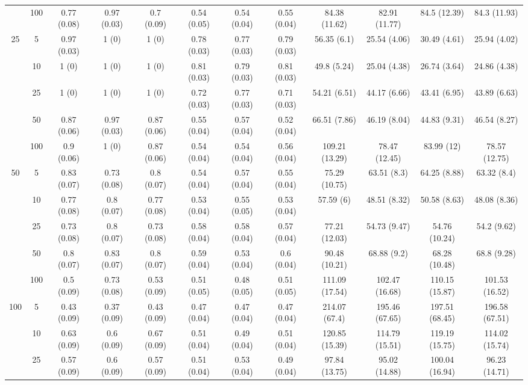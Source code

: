 \documentclass[11pt]{article}
\theoremstyle{definition}
\begin{document}
\begin{table}[H]
\begin{center}
{\begin{tabular}{cc|ccc|ccc|cccc|}
  & 100  & 0.77 (0.08) & 0.97 (0.03) & 0.7 (0.09) & 0.54 (0.05) & 0.54 (0.04) & 0.55 (0.04) & 84.38 (11.62) & 82.91 (11.77) & 84.5 (12.39) & 84.3 (11.93) \\[.3cm] 
  \multirow{5}{*}{25} & 5  & 0.97 (0.03) & 1 (0) & 1 (0) & 0.78 (0.03) & 0.77 (0.03) & 0.79 (0.03) & 56.35 (6.1) & 25.54 (4.06) & 30.49 (4.61) & 25.94 (4.02) \\ 
   & 10  & 1 (0) & 1 (0) & 1 (0) & 0.81 (0.03) & 0.79 (0.03) & 0.81 (0.03) & 49.8 (5.24) & 25.04 (4.38) & 26.74 (3.64) & 24.86 (4.38) \\ 
  & 25  & 1 (0) & 1 (0) & 1 (0) & 0.72 (0.03) & 0.77 (0.03) & 0.71 (0.03) & 54.21 (6.51) & 44.17 (6.66) & 43.41 (6.95) & 43.89 (6.63) \\ 
  & 50  & 0.87 (0.06) & 0.97 (0.03) & 0.87 (0.06) & 0.55 (0.04) & 0.57 (0.04) & 0.52 (0.04) & 66.51 (7.86) & 46.19 (8.04) & 44.83 (9.31) & 46.54 (8.27) \\ 
  & 100  & 0.9 (0.06) & 1 (0) & 0.87 (0.06) & 0.54 (0.04) & 0.54 (0.04) & 0.56 (0.04) & 109.21 (13.29) & 78.47 (12.45) & 83.99 (12) & 78.57 (12.75)\\[.3cm] 
  \multirow{5}{*}{50} & 5  & 0.83 (0.07) & 0.73 (0.08) & 0.8 (0.07) & 0.54 (0.04) & 0.57 (0.04) & 0.55 (0.04) & 75.29 (10.75) & 63.51 (8.3) & 64.25 (8.88) & 63.32 (8.4) \\ 
  & 10  & 0.77 (0.08) & 0.8 (0.07) & 0.77 (0.08) & 0.53 (0.04) & 0.55 (0.05) & 0.53 (0.04) & 57.59 (6) & 48.51 (8.32) & 50.58 (8.63) & 48.08 (8.36) \\ 
  & 25  & 0.73 (0.08) & 0.8 (0.07) & 0.73 (0.08) & 0.58 (0.04) & 0.58 (0.04) & 0.57 (0.04) & 77.21 (12.03) & 54.73 (9.47) & 54.76 (10.24) & 54.2 (9.62) \\ 
  & 50  & 0.8 (0.07) & 0.83 (0.07) & 0.8 (0.07) & 0.59 (0.04) & 0.53 (0.04) & 0.6 (0.04) & 90.48 (10.21) & 68.88 (9.2) & 68.28 (10.48) & 68.8 (9.28) \\ 
  & 100  & 0.5 (0.09) & 0.73 (0.08) & 0.53 (0.09) & 0.51 (0.05) & 0.48 (0.05) & 0.51 (0.05) & 111.09 (17.54) & 102.47 (16.68) & 110.15 (15.87) & 101.53 (16.52) \\[.3cm] 
  \multirow{5}{*}{100} & 5  & 0.43 (0.09) & 0.37 (0.09) & 0.43 (0.09) & 0.47 (0.04) & 0.47 (0.04) & 0.47 (0.04) & 214.07 (67.4) & 195.46 (67.65) & 197.51 (68.45) & 196.58 (67.51) \\ 
  & 10  & 0.63 (0.09) & 0.6 (0.09) & 0.67 (0.09) & 0.51 (0.04) & 0.49 (0.04) & 0.51 (0.04) & 120.85 (15.39) & 114.79 (15.51) & 119.19 (15.75) & 114.02 (15.74) \\ 
  & 25  & 0.57 (0.09) & 0.6 (0.09) & 0.57 (0.09) & 0.51 (0.04) & 0.53 (0.04) & 0.49 (0.04) & 97.84 (13.75) & 95.02 (14.88) & 100.04 (16.94) & 96.23 (14.71) \\ 

\end{tabular}}
\end{center}
\end{table}
\end{document}
